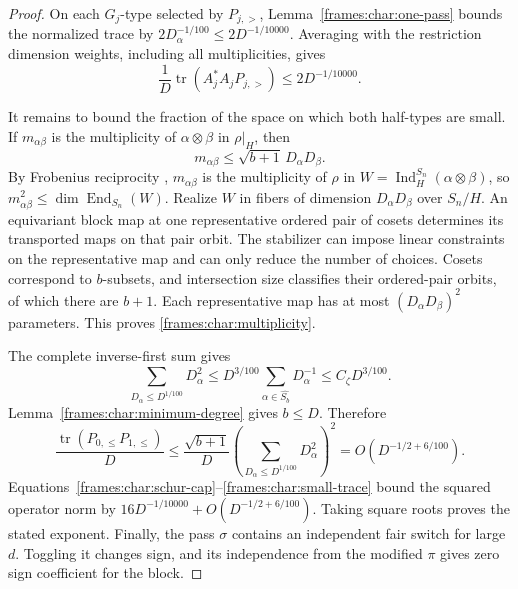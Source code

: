 \begin{proof}
On each $G_j$-type selected by $P_{j,>}$,
Lemma~\ref{frames:char:one-pass} bounds
the normalized trace by
$2D_\alpha^{-1/100}\le2D^{-1/10000}$. Averaging with the restriction
dimension weights, including all multiplicities, gives
\begin{equation}\label{frames:char:large-trace}
 \frac1D\operatorname{tr}(A_j^*A_jP_{j,>})
 \le2D^{-1/10000}.
\end{equation}

It remains to bound the fraction of the space on which both half-types
are small. If $m_{\alpha\beta}$ is the multiplicity of
$\alpha\otimes\beta$ in $\rho|_H$, then
\begin{equation}\label{frames:char:multiplicity}
 m_{\alpha\beta}\le\sqrt{b+1}\,D_\alpha D_\beta.
\end{equation}
By Frobenius reciprocity \cite[Theorem~4.33]{etingof},
$m_{\alpha\beta}$ is the multiplicity of $\rho$ in
$W=\operatorname{Ind}_H^{S_n}(\alpha\otimes\beta)$, so
$m_{\alpha\beta}^2\le\dim\operatorname{End}_{S_n}(W)$.
Realize $W$ in fibers of dimension $D_\alpha D_\beta$ over $S_n/H$.
An equivariant block map at one representative ordered pair of cosets
determines its transported maps on that pair orbit. The stabilizer can
impose linear constraints on the representative map and can only reduce
the number of choices. Cosets correspond to $b$-subsets, and intersection
size classifies their ordered-pair orbits, of which there are $b+1$.
Each representative map has at most $(D_\alpha D_\beta)^2$ parameters.
This proves \eqref{frames:char:multiplicity}.

The complete inverse-first sum gives
\[
 \sum_{D_\alpha\le D^{1/100}}D_\alpha^2
 \le D^{3/100}\sum_{\alpha\in\widehat{S_b}}D_\alpha^{-1}
 \le C_\zeta D^{3/100}.
\]
Lemma~\ref{frames:char:minimum-degree} gives $b\le D$. Therefore
\begin{equation}\label{frames:char:small-trace}
 \frac{\operatorname{tr}(P_{0,\le}P_{1,\le})}{D}
 \le\frac{\sqrt{b+1}}D
       \left(\sum_{D_\alpha\le D^{1/100}}D_\alpha^2\right)^2
 =O(D^{-1/2+6/100}).
\end{equation}
Equations~\eqref{frames:char:schur-cap}--\eqref{frames:char:small-trace}
bound the squared operator norm by
$16D^{-1/10000}+O(D^{-1/2+6/100})$. Taking square roots proves the
stated exponent. Finally, the pass $\sigma$ contains an independent
fair switch for large $d$. Toggling it changes sign, and its independence
from the modified $\pi$ gives zero sign coefficient for the block.
\end{proof}

